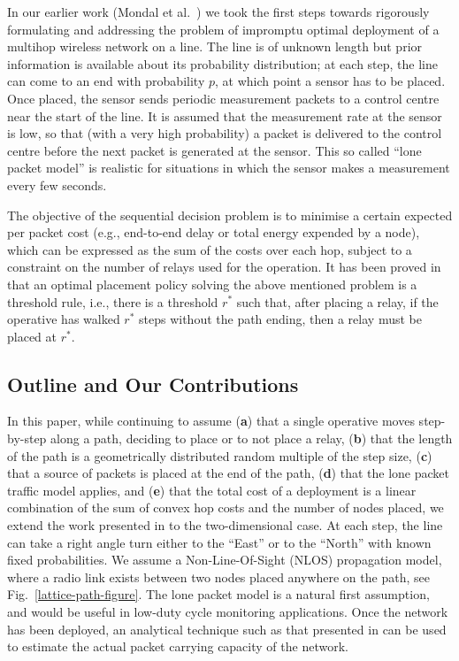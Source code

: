 \documentclass[conference]{IEEEtran}
\begin{document}
In our earlier work (Mondal et al.\
\cite{mondal-etal12impromptu-deployment_NCC}) we took the first steps
towards rigorously formulating and addressing the problem of impromptu
optimal deployment of a multihop wireless network on a line.  The line
is of unknown length but prior information is available about its
probability distribution; at each step, the line can come to an end
with probability $p$, at which point a sensor has to be placed. Once
placed, the sensor sends periodic measurement packets to a control
centre near the start of the line.  It is assumed that the measurement
rate at the sensor is low, so that (with a very high probability) a
packet is delivered to the control centre before the next packet is
generated at the sensor. This so called ``lone packet model'' is
realistic for situations in which the sensor makes a measurement every
few seconds. 

The objective of the sequential decision problem is to minimise a
certain expected per packet cost (e.g., end-to-end delay or total
energy expended by a node), which can be expressed as the sum of the
costs over each hop, subject to a constraint on the number of relays
used for the operation. It has been proved in
\cite{mondal-etal12impromptu-deployment_NCC} that an optimal placement
policy solving the above mentioned problem is a threshold rule, i.e.,
there is a threshold $r^*$ such that, after placing a relay, if the
operative has walked $r^*$ steps without the path ending, then a relay
must be placed at $r^*$.

\subsection{Outline and Our Contributions}
In this paper, while continuing to assume (\textbf{a}) that a single
operative moves step-by-step along a path, deciding to place or to not
place a relay, (\textbf{b}) that the length of the path is a
geometrically distributed random multiple of the step size,
(\textbf{c}) that a source of packets is placed at the end of the
path, (\textbf{d}) that the lone packet traffic model applies, and
(\textbf{e}) that the total cost of a deployment is a linear
combination of the sum of convex hop costs and the number of nodes
placed, we extend the work presented in
\cite{mondal-etal12impromptu-deployment_NCC} to the two-dimensional
case. At each step, the line can take a right angle turn either to the
``East'' or to the ``North'' with known fixed probabilities. We assume
a Non-Line-Of-Sight (NLOS) propagation model, where a radio link
exists between two nodes placed anywhere on the path, see
Fig.~\ref{lattice-path-figure}.  The lone packet model is a natural
first assumption, and would be useful in low-duty cycle monitoring
applications.  Once the network has been deployed, an analytical
technique such as that presented in
\cite{rachit-kumar12performance-analysis} can be used to estimate the
actual packet carrying capacity of the network.
\end{document}
